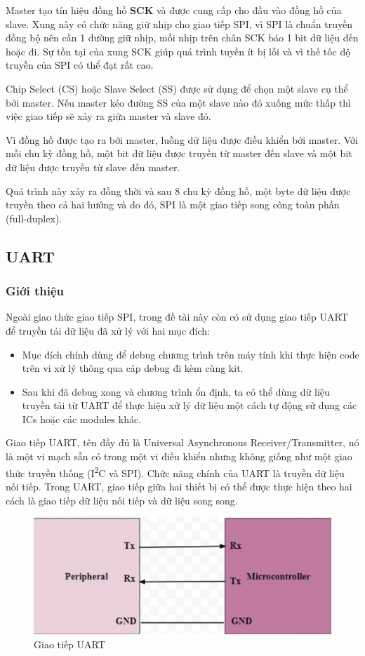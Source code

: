 Master tạo tín hiệu đồng hồ \textbf{SCK} và được cung cấp cho đầu vào đồng hồ của slave. Xung này có chức năng giữ nhịp cho giao tiếp SPI, vì SPI là chuẩn truyền đồng bộ nên cần 1 đường giữ nhịp, mỗi nhịp trên chân SCK báo 1 bit dữ liệu đến hoặc đi. Sự tồn tại của xung SCK giúp quá trình tuyền ít bị lỗi và vì thế tốc độ truyền của SPI có thể đạt rất cao.

Chip Select (CS) hoặc Slave Select (SS) được sử dụng để chọn một slave cụ thể bởi master.
Nếu master kéo đường SS của một slave nào đó xuống mức thấp thì việc giao tiếp sẽ xảy ra giữa master và slave đó.

Vì đồng hồ được tạo ra bởi master, luồng dữ liệu được điều khiển bởi master.
Với mỗi chu kỳ đồng hồ, một bit dữ liệu được truyền từ master đến slave và một bit dữ liệu được truyền từ slave đến master.

Quá trình này xảy ra đồng thời và sau 8 chu kỳ đồng hồ, một byte dữ liệu được truyền theo cả hai hướng và do đó, SPI là một giao tiếp song công toàn phần (full-duplex).

\subsection{UART}
\subsubsection{Giới thiệu}
Ngoài giao thức giao tiếp SPI, trong đề tài này còn có sử dụng giao tiếp UART để truyền tải dữ liệu đã xử lý với hai mục đích:
\begin{itemize}
    \item Mục đích chính dùng để debug chương trình trên máy tính khi thực hiện code trên vi xử lý thông qua cáp debug đi kèm cùng kit.
    \item Sau khi đã debug xong và chương trình ổn định, ta có thể dùng dữ liệu truyền tải từ UART để thực hiện xử lý dữ liệu một cách tự động sử dụng các ICs hoặc các modules khác.
\end{itemize}

Giao tiếp UART, tên đầy đủ là Universal Asynchronous Receiver/Transmitter, nó là một vi mạch sẵn có trong một vi điều khiển
nhưng không giống như một giao thức truyền thống (I\textsuperscript{2}C  và SPI).
Chức năng chính của UART là truyền dữ liệu nối tiếp.
Trong UART, giao tiếp giữa hai thiết bị có thể được thực hiện theo hai cách là giao tiếp dữ liệu nối tiếp và dữ liệu song song.

\begin{figure}[ht]
\centering
\includegraphics[scale=0.5]{images/UART_communication.png}
\caption{Giao tiếp UART}
\end{figure}

